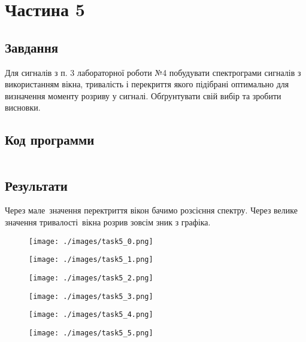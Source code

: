 \section{Частина 5}
\label{sec:task5}

\subsection{Завдання}
\label{subsec:task5_task}

Для сигналів з п. 3 лабораторної роботи №4 побудувати спектрограми
сигналів з використанням вікна, тривалість і перекриття якого підібрані
оптимально для визначення моменту розриву у сигналі.
Обґрунтувати свій вибір та зробити висновки.

\subsection{Код программи}
\label{subsec:task5_code}
\inputminted{python}{../src/task5.py}

\subsection{Результати}
\label{subsec:task5_results}

Через мале значення перектриття вікон бачимо розсієння спектру.
Через велике значення тривалості вікна розрив зовсім зник з графіка.

\begin{figure}[!ht]
    \centering
    \texttt{[image: ./images/task5\_0.png]}
\end{figure}

\begin{figure}[!ht]
    \centering
    \texttt{[image: ./images/task5\_1.png]}
\end{figure}

\begin{figure}[!ht]
    \centering
    \texttt{[image: ./images/task5\_2.png]}
\end{figure}

\begin{figure}[!ht]
    \centering
    \texttt{[image: ./images/task5\_3.png]}
\end{figure}

\begin{figure}[!ht]
    \centering
    \texttt{[image: ./images/task5\_4.png]}
\end{figure}

\begin{figure}[!ht]
    \centering
    \texttt{[image: ./images/task5\_5.png]}
\end{figure}
